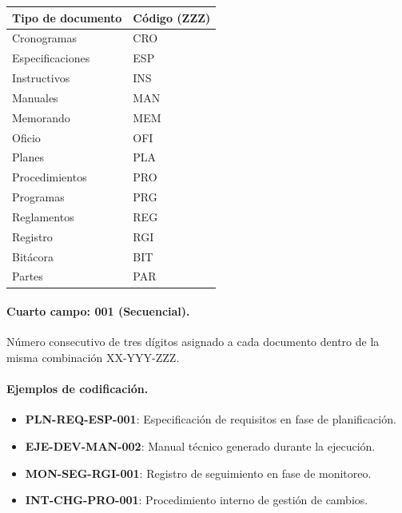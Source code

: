 \documentclass{encabezado}
\begin{document}
\begin{center}
    \footnotesize
    \renewcommand{\arraystretch}{1.3}
    \begin{tabular}{p{7cm} p{2cm}}
        \hline
        \textbf{Tipo de documento} & \textbf{Código (ZZZ)} \\
        \hline
        Cronogramas                & CRO                   \\
        Especificaciones           & ESP                   \\
        Instructivos               & INS                   \\
        Manuales                   & MAN                   \\
        Memorando                  & MEM                   \\
        Oficio                     & OFI                   \\
        Planes                     & PLA                   \\
        Procedimientos             & PRO                   \\
        Programas                  & PRG                   \\
        Reglamentos                & REG                   \\
        Registro                   & RGI                   \\
        Bitácora                   & BIT                   \\
        Partes                     & PAR                   \\
        \hline
    \end{tabular}
\end{center}

\paragraph{Cuarto campo: 001 (Secuencial).}

Número consecutivo de tres dígitos asignado a cada documento dentro de la misma combinación XX-YYY-ZZZ.

\paragraph{Ejemplos de codificación.}

\begin{itemize}
    \item \textbf{PLN-REQ-ESP-001}: Especificación de requisitos en fase de planificación.
    \item \textbf{EJE-DEV-MAN-002}: Manual técnico generado durante la ejecución.
    \item \textbf{MON-SEG-RGI-001}: Registro de seguimiento en fase de monitoreo.
    \item \textbf{INT-CHG-PRO-001}: Procedimiento interno de gestión de cambios.
\end{itemize}
\end{document}
